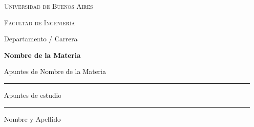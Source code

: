 \documentclass[12pt,oneside]{book}
\newcommand{\universidad}{Universidad de Buenos Aires}
\newcommand{\facultad}{Facultad de Ingeniería}
\newcommand{\departamento}{Departamento / Carrera}
\newcommand{\materia}{Nombre de la Materia}
\newcommand{\titulo}{Apuntes de \materia}
\newcommand{\autor}{Nombre y Apellido}
\newcommand{\anio}{\the\year}
\begin{document}

\begin{titlepage}

\thispagestyle{empty}

\begin{center}

\vspace*{1cm}

%

\vspace{1cm}

{\large \textsc{\universidad}}

\vspace{0.2cm}

{\large \textsc{\facultad}}

\vspace{0.2cm}

{\large \departamento}

\vspace{3cm}

{\Huge \textbf{\materia}}

\vspace{1cm}

{\LARGE \titulo}

\vspace{1.5cm}

\rule{0.70\textwidth}{0.5pt}

\vspace{0.5cm}

{\large Apuntes de estudio}

\vspace{0.5cm}

\rule{0.70\textwidth}{0.5pt}

\vfill

{\large \autor}

\vspace{0.3cm}

{\large \anio}

\end{center}

\end{titlepage}

\end{document}
